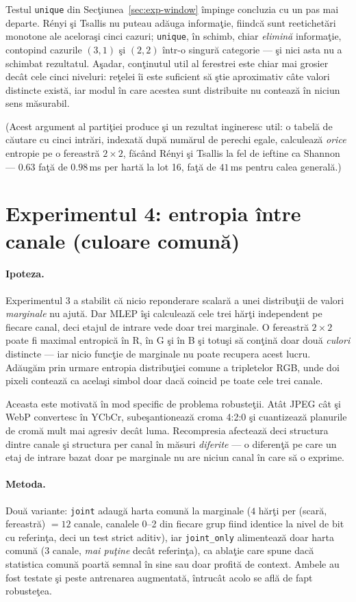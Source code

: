 Testul \texttt{unique} din Secţiunea~\ref{sec:exp-window} împinge concluzia cu
un pas mai departe. Rényi şi Tsallis nu puteau adăuga informaţie, fiindcă sunt
reetichetări monotone ale aceloraşi cinci cazuri; \texttt{unique}, în schimb,
chiar \emph{elimină} informaţie, contopind cazurile $(3,1)$ şi $(2,2)$ într-o
singură categorie --- şi nici asta nu a schimbat rezultatul. Aşadar, conţinutul
util al ferestrei este chiar mai grosier decât cele cinci niveluri: reţelei îi
este suficient să ştie aproximativ câte valori distincte există, iar modul în
care acestea sunt distribuite nu contează în niciun sens măsurabil.

(Acest argument al partiţiei produce şi un rezultat ingineresc util: o tabelă de
căutare cu cinci intrări, indexată după numărul de perechi egale, calculează
\emph{orice} entropie pe o fereastră $2\times2$, făcând Rényi şi Tsallis la fel
de ieftine ca Shannon --- $0.63$ faţă de $0.98$\,ms per hartă la lot 16, faţă de
$41$\,ms pentru calea generală.)

\section{Experimentul 4: entropia între canale (culoare comună)}
\label{sec:exp-color}

\paragraph{Ipoteza.} Experimentul 3 a stabilit că nicio reponderare scalară a
unei distribuţii de valori \emph{marginale} nu ajută. Dar MLEP îşi calculează
cele trei hărţi independent pe fiecare canal, deci etajul de intrare vede doar
trei marginale. O fereastră $2\times2$ poate fi maximal entropică în R, în G şi
în B şi totuşi să conţină doar două \emph{culori} distincte --- iar nicio
funcţie de marginale nu poate recupera acest lucru. Adăugăm prin urmare entropia
distribuţiei comune a tripletelor RGB, unde doi pixeli contează ca acelaşi
simbol doar dacă coincid pe toate cele trei canale.

Aceasta este motivată în mod specific de problema robusteţii. Atât JPEG cât şi
WebP convertesc în YCbCr, subeşantionează croma 4:2:0 şi cuantizează planurile
de cromă mult mai agresiv decât luma. Recompresia afectează deci structura
dintre canale şi structura per canal în măsuri \emph{diferite} --- o diferenţă
pe care un etaj de intrare bazat doar pe marginale nu are niciun canal în care
să o exprime.

\paragraph{Metoda.} Două variante: \texttt{joint} adaugă harta comună la
marginale ($4$ hărţi per (scară, fereastră) $=12$ canale, canalele 0--2 din
fiecare grup fiind identice la nivel de bit cu referinţa, deci un test strict
aditiv), iar \texttt{joint\_only} alimentează doar harta comună ($3$ canale,
\emph{mai puţine} decât referinţa), ca ablaţie care spune dacă statistica comună
poartă semnal în sine sau doar profită de context. Ambele au fost testate şi
peste antrenarea augmentată, întrucât acolo se află de fapt robusteţea.

